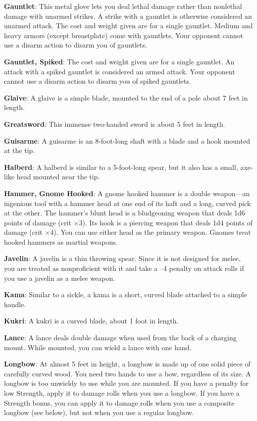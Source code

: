 \textbf{Gauntlet}: This metal glove lets you deal lethal damage rather than nonlethal damage with unarmed strikes. A strike with a gauntlet is otherwise considered an unarmed attack. The cost and weight given are for a single gauntlet. Medium and heavy armors (except breastplate) come with gauntlets. Your opponent cannot use a disarm action to disarm you of gauntlets.
		
\textbf{Gauntlet, Spiked}: The cost and weight given are for a single gauntlet. An attack with a spiked gauntlet is considered an armed attack. Your opponent cannot use a disarm action to disarm you of spiked gauntlets.
		
\textbf{Glaive}: A glaive is a simple blade, mounted to the end of a pole about 7 feet in length.
		
\textbf{Greatsword}: This immense two-handed sword is about 5 feet in length.
		
\textbf{Guisarme}: A guisarme is an 8-foot-long shaft with a blade and a hook mounted at the tip.
		
\textbf{Halberd}: A halberd is similar to a 5-foot-long spear, but it also has a small, axe-like head mounted near the tip.
		
\textbf{Hammer, Gnome Hooked}: A gnome hooked hammer is a double weapon---an ingenious tool with a hammer head at one end of its haft and a long, curved pick at the other. The hammer's blunt head is a bludgeoning weapon that deals 1d6 points of damage (crit \mbox{$\times$}3). Its hook is a piercing weapon that deals 1d4 points of damage (crit \mbox{$\times$}4). You can use either head as the primary weapon. Gnomes treat hooked hammers as martial weapons.
		
\textbf{Javelin}: A javelin is a thin throwing spear. Since it is not designed for melee, you are treated as nonproficient with it and take a --4 penalty on attack rolls if you use a javelin as a melee weapon.
		
\textbf{Kama}: Similar to a sickle, a kama is a short, curved blade attached to a simple handle.
		
\textbf{Kukri}: A kukri is a curved blade, about 1 foot in length.
		
\textbf{Lance}: A lance deals double damage when used from the back of a charging mount. While mounted, you can wield a lance with one hand.
		
\textbf{Longbow}: At almost 5 feet in height, a longbow is made up of one solid piece of carefully curved wood. You need two hands to use a bow, regardless of its size. A longbow is too unwieldy to use while you are mounted. If you have a penalty for low Strength, apply it to damage rolls when you use a longbow. If you have a Strength bonus, you can apply it to damage rolls when you use a composite longbow (see below), but not when you use a regular longbow.
		
